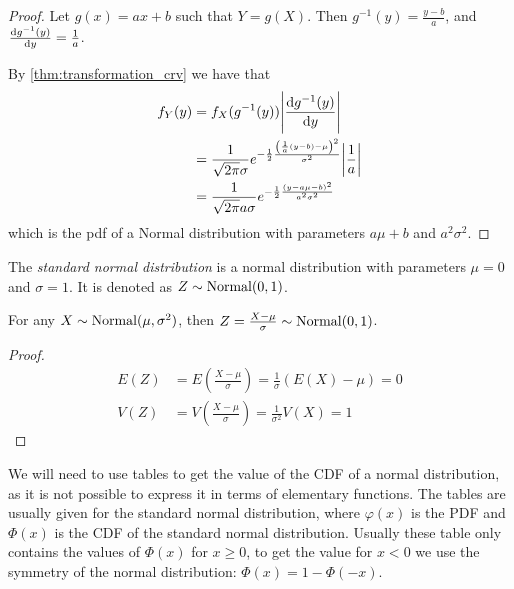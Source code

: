 \documentclass[12pt]{extarticle}
\newcommand{\Normal}{{\operatorfont Normal}}
\begin{document}
\begin{proof}
    Let $g(x) = ax + b$ such that $Y = g(X)$.
    Then $g^{-1}(y) = \frac{y - b}{a}$, and $\dv{g^{-1}(y)}{y} = \frac{1}{a}$.

    By \autoref{thm:transformation_crv} we have that
    \begin{align}
        f_Y(y) & = f_X(g^{-1}(y)) \abs{\dv{g^{-1}(y)}{y}}                                                                                \\
               & = \frac{1}{\sqrt{2\pi} \sigma} e^{-\frac{1}{2} \frac{\left(\frac{1}{a}(y-b)- \mu\right)^2}{\sigma^2}} \abs{\frac{1}{a}} \\
               & = \frac{1}{\sqrt{2\pi} a \sigma} e^{-\frac{1}{2} \frac{(y - a\mu - b)^2}{a^2 \sigma^2}}
    \end{align}
    which is the pdf of a Normal distribution with parameters $a\mu + b$ and $a^2 \sigma^2$.
\end{proof}

\begin{definition}
    The \emph{standard normal distribution} is a normal distribution with parameters $\mu = 0$ and $\sigma = 1$. It is denoted as $Z \sim \Normal(0, 1)$.
\end{definition}

\begin{lemma}
    For any $X \sim \Normal(\mu, \sigma^2)$, then $Z = \frac{X - \mu}{\sigma} \sim \Normal(0, 1)$.
\end{lemma}

\begin{proof}
    \begin{align}
        E(Z) & = E\left(\frac{X - \mu}{\sigma}\right) = \frac{1}{\sigma} (E(X) - \mu) = 0 \\
        V(Z) & = V\left(\frac{X - \mu}{\sigma}\right) = \frac{1}{\sigma^2} V(X) = 1
    \end{align}
\end{proof}

\begin{remark}
    We will need to use tables to get the value of the CDF of a normal distribution, as it is not possible to express it in terms of elementary functions.
    The tables are usually given for the standard normal distribution, where $\varphi(x)$ is the PDF and $\Phi(x)$ is the CDF of the standard normal distribution.
    Usually these table only contains the values of $\Phi(x)$ for $x \geq 0$, to get the value for $x < 0$ we use the symmetry of the normal distribution: $\Phi(x) = 1 - \Phi(-x)$.
\end{remark}
\end{document}
